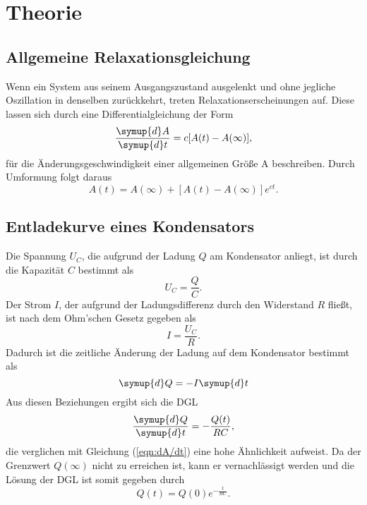 \section{Theorie}
\label{sec:Theorie}

\subsection{Allgemeine Relaxationsgleichung}
Wenn ein System aus seinem Ausgangszustand ausgelenkt und ohne jegliche Oszillation in denselben zurückkehrt, treten Relaxationserscheinungen auf. Diese lassen sich durch
eine Differentialgleichung der Form
\begin{equation}
    \label{eqn:dA/dt}
    \frac{\symup{d}A}{\symup{d}t} = c[A(t)-A(\infty)],
\end{equation}
für die Änderungsgeschwindigkeit einer allgemeinen Größe A beschreiben.
Durch Umformung folgt daraus
\begin{equation}
    \label{eqn:AllgemeineRelaxationsgleichung}
    A(t)=A(\infty)+[A(t)-A(\infty)]e^{ct}.
\end{equation}


\subsection{Entladekurve eines Kondensators}
Die Spannung $U_C$, die aufgrund der Ladung $Q$ am Kondensator anliegt, ist durch die Kapazität $C$ bestimmt als
\begin{equation*}
    U_C=\frac{Q}{C}.
\end{equation*}
Der Strom $I$, der aufgrund der Ladungsdifferenz durch den Widerstand $R$ fließt, ist nach dem Ohm'schen Gesetz gegeben als
\begin{equation*}
    I=\frac{U_C}{R}.
\end{equation*}
Dadurch ist die zeitliche Änderung der Ladung auf dem Kondensator bestimmt als
\begin{equation*}
    \symup{d}Q=-I\symup{d}t
\end{equation*}
Aus diesen Beziehungen ergibt sich die DGL
\begin{equation}
    \label{eqn:dQ/dt}
    \frac{\symup{d}Q}{\symup{d}t}=-\frac{Q(t)}{RC},
\end{equation}
die verglichen mit Gleichung (\ref{eqn:dA/dt}) eine hohe Ähnlichkeit aufweist. Da der Grenzwert $Q(\infty)$ nicht zu erreichen ist, kann er vernachlässigt werden und die Lösung
der DGL ist somit gegeben durch
\begin{equation}
    \label{eqn:Entladung}
    Q(t)=Q(0)e^{-\frac{t}{RC}}.
\end{equation}


